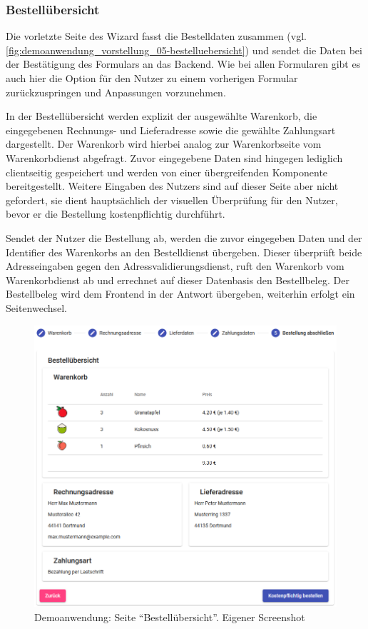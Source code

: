 \subsubsection{Bestellübersicht}

Die vorletzte Seite des Wizard fasst die Bestelldaten zusammen (vgl. \autoref{fig:demoanwendung_vorstellung_05-bestelluebersicht}) und sendet die Daten bei der Bestätigung des Formulars an das Backend. Wie bei allen Formularen gibt es auch hier die Option für den Nutzer zu einem vorherigen Formular zurückzuspringen und Anpassungen vorzunehmen.

In der Bestellübersicht werden explizit der ausgewählte Warenkorb, die eingegebenen Rechnungs- und Lieferadresse sowie die gewählte Zahlungsart dargestellt. Der Warenkorb wird hierbei analog zur Warenkorbseite vom Warenkorbdienst abgefragt. Zuvor eingegebene Daten sind hingegen lediglich clientseitig gespeichert und werden von einer übergreifenden Komponente bereitgestellt. Weitere Eingaben des Nutzers sind auf dieser Seite aber nicht gefordert, sie dient hauptsächlich der visuellen Überprüfung für den Nutzer, bevor er die Bestellung kostenpflichtig durchführt.

Sendet der Nutzer die Bestellung ab, werden die zuvor eingegeben Daten und der Identifier des Warenkorbs an den Bestelldienst übergeben. Dieser überprüft beide Adresseingaben gegen den Adressvalidierungsdienst, ruft den Warenkorb vom Warenkorbdienst ab und errechnet auf dieser Datenbasis den Bestellbeleg. Der Bestellbeleg wird dem Frontend in der Antwort übergeben, weiterhin erfolgt ein Seitenwechsel.

\begin{figure}[H]
	\centering
	\includegraphics[width=0.68\linewidth]{img/04_erstellung-poc/demoanwendung_vorstellung_05-bestelluebersicht_cropped}
	\caption{Demoanwendung: Seite \enquote{Bestellübersicht}. Eigener Screenshot}
	\label{fig:demoanwendung_vorstellung_05-bestelluebersicht}
\end{figure}

